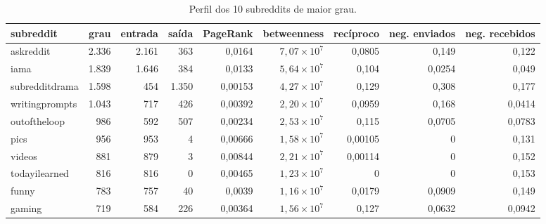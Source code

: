 \begin{table}[t]
\centering
\small
\caption{Perfil dos 10 subreddits de maior grau.}
\label{tab:hubs}
\begin{adjustbox}{max width=\linewidth}
\begin{tabular}{lrrrrrrrr}
\toprule
subreddit & grau & entrada & saída & PageRank & betweenness & recíproco & neg. enviados & neg. recebidos \\
\midrule
askreddit & 2.336 & 2.161 & 363 & 0,0164 & $7,07 \times 10^{7}$ & 0,0805 & 0,149 & 0,122 \\
iama & 1.839 & 1.646 & 384 & 0,0133 & $5,64 \times 10^{7}$ & 0,104 & 0,0254 & 0,049 \\
subredditdrama & 1.598 & 454 & 1.350 & 0,00153 & $4,27 \times 10^{7}$ & 0,129 & 0,308 & 0,177 \\
writingprompts & 1.043 & 717 & 426 & 0,00392 & $2,20 \times 10^{7}$ & 0,0959 & 0,168 & 0,0414 \\
outoftheloop & 986 & 592 & 507 & 0,00234 & $2,53 \times 10^{7}$ & 0,115 & 0,0705 & 0,0783 \\
pics & 956 & 953 & 4 & 0,00666 & $1,58 \times 10^{7}$ & 0,00105 & 0 & 0,131 \\
videos & 881 & 879 & 3 & 0,00844 & $2,21 \times 10^{7}$ & 0,00114 & 0 & 0,152 \\
todayilearned & 816 & 816 & 0 & 0,00465 & $1,23 \times 10^{7}$ & 0 & 0 & 0,153 \\
funny & 783 & 757 & 40 & 0,0039 & $1,16 \times 10^{7}$ & 0,0179 & 0,0909 & 0,149 \\
gaming & 719 & 584 & 226 & 0,00364 & $1,56 \times 10^{7}$ & 0,127 & 0,0632 & 0,0942 \\
\bottomrule
\end{tabular}
\end{adjustbox}
\end{table}
